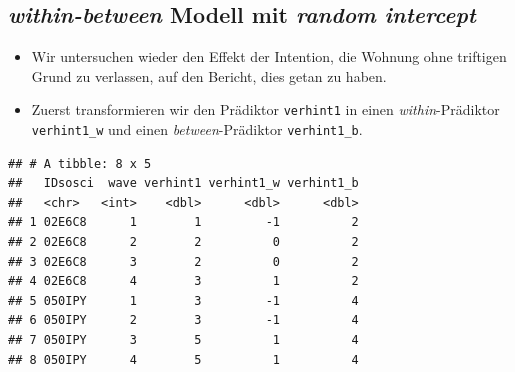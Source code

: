 \documentclass[
]{book}
\newenvironment{Shaded}{\begin{snugshade}}{\end{snugshade}}
\newcommand{\CommentTok}[1]{\textcolor[rgb]{0.56,0.35,0.01}{\textit{#1}}}
\newcommand{\DataTypeTok}[1]{\textcolor[rgb]{0.13,0.29,0.53}{#1}}
\newcommand{\KeywordTok}[1]{\textcolor[rgb]{0.13,0.29,0.53}{\textbf{#1}}}
\newcommand{\NormalTok}[1]{#1}
\newcommand{\OperatorTok}[1]{\textcolor[rgb]{0.81,0.36,0.00}{\textbf{#1}}}
\newcommand{\StringTok}[1]{\textcolor[rgb]{0.31,0.60,0.02}{#1}}
\begin{document}
\hypertarget{within-between-modell-mit-random-intercept}{%
\subsection*{\texorpdfstring{\emph{within-between} Modell mit \emph{random intercept}}{within-between Modell mit random intercept}}\label{within-between-modell-mit-random-intercept}}

\begin{itemize}
\item
  Wir untersuchen wieder den Effekt der Intention, die Wohnung ohne triftigen Grund zu verlassen, auf den Bericht, dies getan zu haben.
\item
  Zuerst transformieren wir den Prädiktor \texttt{verhint1} in einen \emph{within}-Prädiktor \texttt{verhint1\_w} und einen \emph{between}-Prädiktor \texttt{verhint1\_b}.
\end{itemize}

\begin{Shaded}
\end{Shaded}

\begin{verbatim}
## # A tibble: 8 x 5
##   IDsosci  wave verhint1 verhint1_w verhint1_b
##   <chr>   <int>    <dbl>      <dbl>      <dbl>
## 1 02E6C8      1        1         -1          2
## 2 02E6C8      2        2          0          2
## 3 02E6C8      3        2          0          2
## 4 02E6C8      4        3          1          2
## 5 050IPY      1        3         -1          4
## 6 050IPY      2        3         -1          4
## 7 050IPY      3        5          1          4
## 8 050IPY      4        5          1          4
\end{verbatim}
\end{document}
